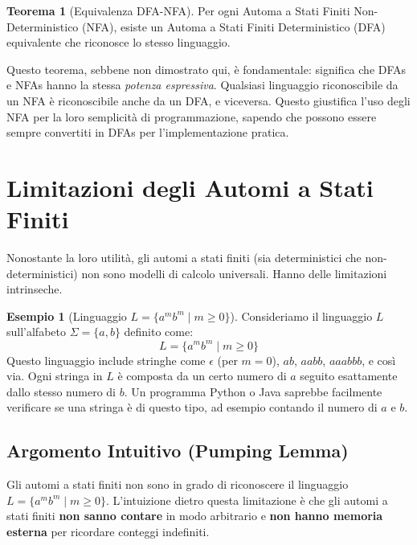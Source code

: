 \documentclass[a4paper]{article}
\theoremstyle{definition} %
\newtheorem{theorem}{Teorema}
[section]
\newtheorem{example}{Esempio}[section]
\begin{document}
\begin{theorem}[Equivalenza DFA-NFA]
Per ogni Automa a Stati Finiti Non-Deterministico (NFA), esiste un Automa a Stati Finiti Deterministico (DFA) equivalente che riconosce lo stesso linguaggio.
\end{theorem}
Questo teorema, sebbene non dimostrato qui, è fondamentale: significa che DFAs e NFAs hanno la stessa \emph{potenza espressiva}. Qualsiasi linguaggio riconoscibile da un NFA è riconoscibile anche da un DFA, e viceversa. Questo giustifica l'uso degli NFA per la loro semplicità di programmazione, sapendo che possono essere sempre convertiti in DFAs per l'implementazione pratica.

\section{Limitazioni degli Automi a Stati Finiti}
Nonostante la loro utilità, gli automi a stati finiti (sia deterministici che non-deterministici) non sono modelli di calcolo universali. Hanno delle limitazioni intrinseche.

\begin{example}[Linguaggio $L = \{a^m b^m \mid m \geq 0\}$]
Consideriamo il linguaggio $L$ sull'alfabeto $\Sigma = \{a, b\}$ definito come:
\[ L = \{a^m b^m \mid m \geq 0\} \]
Questo linguaggio include stringhe come $\epsilon$ (per $m=0$), $ab$, $aabb$, $aaabbb$, e così via. Ogni stringa in $L$ è composta da un certo numero di $a$ seguito esattamente dallo stesso numero di $b$.
Un programma Python o Java saprebbe facilmente verificare se una stringa è di questo tipo, ad esempio contando il numero di $a$ e $b$.
\end{example}

\subsection{Argomento Intuitivo (Pumping Lemma)}
Gli automi a stati finiti non sono in grado di riconoscere il linguaggio $L = \{a^m b^m \mid m \geq 0\}$. L'intuizione dietro questa limitazione è che gli automi a stati finiti \textbf{non sanno contare} in modo arbitrario e \textbf{non hanno memoria esterna} per ricordare conteggi indefiniti.
\end{document}
